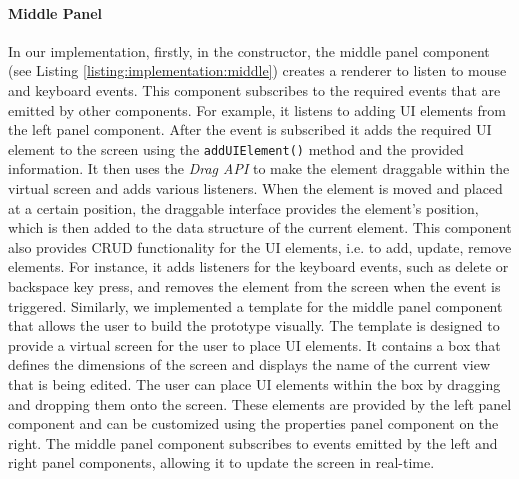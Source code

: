 \paragraph{Middle Panel}
In our implementation, firstly, in the constructor, the middle panel component (see Listing \ref{listing:implementation:middle}) creates a renderer to listen to mouse and keyboard events.
This component subscribes to the required events that are emitted by other components. 
For example, it listens to adding UI elements from the left panel component. 
After the event is subscribed it adds the required UI element to the screen using the \texttt{addUIElement()} method and the provided information.
It then uses the \textit{Drag API} to make the element draggable within the virtual screen and adds various listeners.
When the element is moved and placed at a certain position, the draggable interface provides the element's position, which is then added to the data structure of the current element.  
This component also provides CRUD functionality for the UI elements, i.e. to add, update, remove elements.
For instance, it adds listeners for the keyboard events, such as delete or backspace key press, and removes the element from the screen when the event is triggered.
Similarly, we implemented a template for the middle panel component that allows the user to build the prototype visually. 
The template is designed to provide a virtual screen for the user to place UI elements. 
It contains a box that defines the dimensions of the screen and displays the name of the current view that is being edited. 
The user can place UI elements within the box by dragging and dropping them onto the screen. 
These elements are provided by the left panel component and can be customized using the properties panel component on the right. 
The middle panel component subscribes to events emitted by the left and right panel components, allowing it to update the screen in real-time.

